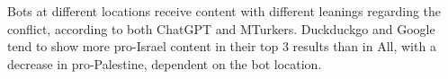 \begin{takeaway}
\takeawaytitle{}
Bots at different locations receive content with different leanings regarding the conflict, according to both ChatGPT and MTurkers. Duckduckgo and Google tend to show more pro-Israel content in their top 3 results than in All, with a decrease in pro-Palestine, dependent on the bot location.
\end{takeaway}

